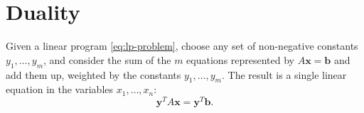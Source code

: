 \documentclass{amsbook}
\newcommand{\xx}{\mathbf x}
\newcommand{\yy}{\mathbf y}
\newcommand{\bb}{\mathbf b}
\theoremstyle{definition}
\theoremstyle{remark}
\begin{document}
\section{Duality}
\label{sec:duality}

Given a linear program \eqref{eq:lp-problem}, choose any set of non-negative constants $y_1,\dotsc,y_m$, and consider the sum of the $m$ equations represented by $A\xx=\bb$ and add them up, weighted by the constants $y_1,\dotsc,y_m$.
The result is a single linear equation in the variables $x_1,\dotsc,x_n$:
\begin{displaymath}
  \yy^TA\xx=\yy^T\bb.
\end{displaymath}


\end{document}
